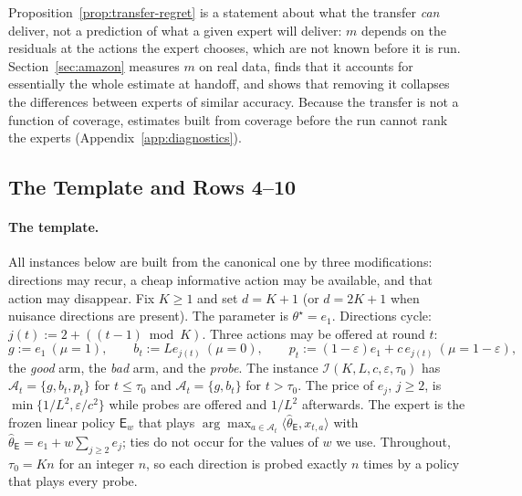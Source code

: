 \documentclass{article}
\theoremstyle{definition}
\theoremstyle{remark}
\newcommand{\eps}{\varepsilon}
\theoremstyle{remark}
\newcommand{\Exp}{\mathsf{E}}
\begin{document}
Proposition~\ref{prop:transfer-regret} is a statement about what the transfer
\emph{can} deliver, not a prediction of what a given expert will
deliver: $m$ depends on the residuals at the actions the expert chooses, which
are not known before it is run. Section~\ref{sec:amazon} measures $m$ on real
data, finds that it accounts for essentially the whole estimate at handoff,
and shows that removing it collapses the differences between experts of
similar accuracy. Because the transfer is not a function of coverage,
estimates built from coverage before the run cannot rank the experts
(Appendix~\ref{app:diagnostics}).

\subsection{The Template and Rows 4--10}
\label{sec:template}


\paragraph{The template.}
All instances below are built from the canonical one by three modifications:
directions may recur, a cheap informative action may be available, and that
action may disappear. Fix $K\ge1$ and set $d=K+1$ (or $d=2K+1$ when nuisance
directions are present). The parameter is $\theta^\star=e_1$. Directions
cycle: $j(t):=2+((t-1)\bmod K)$. Three actions may be offered at round $t$:
\[
g:=e_1\ (\mu=1),\qquad
b_t:=Le_{j(t)}\ (\mu=0),\qquad
p_t:=(1-\eps)e_1+c\,e_{j(t)}\ (\mu=1-\eps),
\]
the \emph{good} arm, the \emph{bad} arm, and the \emph{probe}. The instance
$\mathcal I(K,L,c,\eps,\tau_0)$ has $\mathcal A_t=\{g,b_t,p_t\}$ for $t\le\tau_0$
and $\mathcal A_t=\{g,b_t\}$ for $t>\tau_0$. The price of $e_j$, $j\ge2$, is
$\min\{1/L^2,\eps/c^2\}$ while probes are offered and $1/L^2$ afterwards. The
expert is the frozen linear policy $\Exp_w$ that plays
$\arg\max_{a\in\mathcal A_t}\langle\widehat\theta_{\Exp},x_{t,a}\rangle$ with
$\widehat\theta_{\Exp}=e_1+w\sum_{j\ge2}e_j$; ties do not occur for the values
of $w$ we use. Throughout, $\tau_0=Kn$ for an integer $n$, so each direction is
probed exactly $n$ times by a policy that plays every probe.
\end{document}
